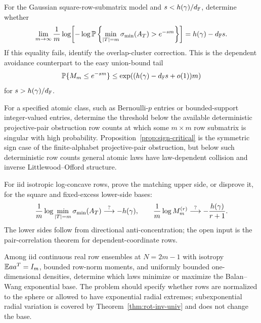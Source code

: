 \begin{problem}\label{prob:avoidance}
For the Gaussian square-row-submatrix model and \(s<h(\gamma)/d_{\mathbb{F}}\), determine
whether
\[
  \lim_{m\to\infty}\frac1m
  \log\!\left[-\log\mathbb{P}\left\{
  \min_{|T|=m}\sigma_{\min}(A_T)>e^{-sm}
  \right\}\right]
  =h(\gamma)-d_{\mathbb{F}} s.
\]
If this equality fails, identify the overlap-cluster correction.  This is the
dependent avoidance counterpart to the easy union-bound tail
\[
  \mathbb{P}\{M_m\le e^{-sm}\}\le \exp((h(\gamma)-d_{\mathbb{F}} s+o(1))m)
\]
for \(s>h(\gamma)/d_{\mathbb{F}}\).
\end{problem}

\begin{problem}\label{prob:atomic-fullspark}
For a specified atomic class, such as Bernoulli-\(p\) entries or bounded-support
integer-valued entries, determine the threshold below the available deterministic
projective-pair obstruction row counts at which some \(m\times m\) row
submatrix is singular with high probability.  Proposition~\ref{prop:sign-critical}
is the symmetric sign case of the finite-alphabet projective-pair obstruction,
but below such deterministic row counts general atomic laws have law-dependent
collision and inverse Littlewood--Offord structure.
\end{problem}

\begin{problem}\label{prob:logconcave}
For iid isotropic log-concave rows, prove the matching upper side, or disprove
it, for the square and fixed-excess lower-side bases:
\[
  \frac1m\log\min_{|T|=m}\sigma_{\min}(A_T)\stackrel{?}{\longrightarrow}-h(\gamma),
  \qquad
  \frac1m\log M_m^{(r)}\stackrel{?}{\longrightarrow}
  -\frac{h(\gamma)}{r+1}.
\]
The lower sides follow from directional anti-concentration; the open input is
the pair-correlation theorem for dependent-coordinate rows.
\end{problem}

\begin{problem}\label{prob:frame-design}
Among iid continuous real row ensembles at \(N=2m-1\) with isotropy
\(\mathbb{E} aa^T=I_m\), bounded row-norm moments, and uniformly bounded one-dimensional
densities, determine which laws minimize or maximize the Balan--Wang exponential
base.  The problem should specify whether rows are normalized to the sphere or
allowed to have exponential radial extremes; subexponential radial variation is
covered by Theorem~\ref{thm:rot-inv-univ} and does not change the base.
\end{problem}

